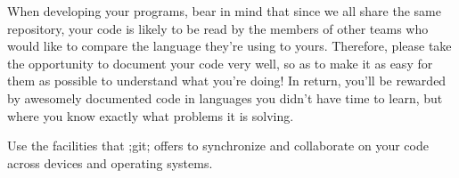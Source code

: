 \documentclass[11pt]{amsart}
\begin{document}
\begin{enumerate}
  \smallskip
  When developing your programs, bear in mind that since we all share the same repository,
  your code is likely to be read by the members of other teams who would like to compare the language they're using to yours.
  Therefore, please take the opportunity to document your code very well, so as to make it as easy for them as possible to understand what you're doing!
  In return, you'll be rewarded by awesomely documented code in languages you didn't have time to learn, but where you know exactly what problems it is solving.

  \smallskip
  Use the facilities that ;git; offers to synchronize and collaborate on your code across devices and operating systems.
\end{enumerate}
\end{document}
